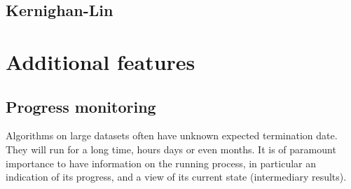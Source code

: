 \documentclass[11pt,a4paper]{article}
\begin{document}
\subsection{Kernighan-Lin}



\section{Additional features}

\subsection{Progress monitoring}

Algorithms on large datasets often have unknown expected termination date. They will run for a long time, hours days or even months. It is of paramount importance to have information on the running process, in particular an indication of its progress, and a view of its current state (intermediary results).
\end{document}
